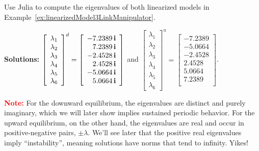 \begin{example} 
\label{ex:eigenvaluesLinearizedModel3LinkManipulator}
Use Julia to compute the eigenvalues of both linearized models in Example~\ref{ex:linearizedModel3LinkManipulator}. 
   
\end{example} 
\textbf{Solutions:} \quad \Ans \quad$ \left[ \begin{array}{c} \lambda_1\\ \lambda_2 \\ \lambda_3 \\\lambda_4 \\ \lambda_5 \\ \lambda_6\end{array} \right]^d = \left[
\begin{array}{r}
-7.2389 \mathop{\bm{\mathrm i}} \\
7.2389 \mathop{\bm{\mathrm i}} \\
-2.4528 \mathop{\bm{\mathrm i}} \\
2.4528 \mathop{\bm{\mathrm i}} \\
-5.0664 \mathop{\bm{\mathrm i}} \\
5.0664 \mathop{\bm{\mathrm i}} \\
\end{array}
\right]$ \quad and \quad \Ans \quad $\left[ \begin{array}{c} \lambda_1\\ \lambda_2 \\ \lambda_3 \\\lambda_4 \\ \lambda_5 \\ \lambda_6\end{array} \right]^u = \left[
\begin{array}{r}
-7.2389 \\
-5.0664 \\
-2.4528 \\
2.4528 \\
5.0664 \\
7.2389 \\
\end{array}
\right]$.

\bigskip

\textcolor{red}{\bf Note:} For the downward equilibrium, the eigenvalues are distinct and purely imaginary, which we will later show implies sustained periodic behavior. For the upward equilibrium, on the other hand, the eigenvalues are real and occur in positive-negative pairs, $\pm \lambda$. We'll see later that the positive real eigenvalues imply ``instability'', meaning solutions have norms that tend to infinity. Yikes! \\

